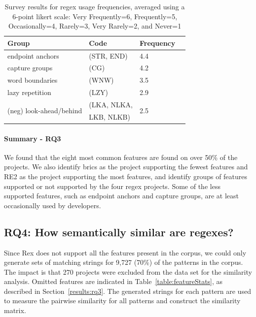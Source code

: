 \begin{table}
\caption{Survey results for regex usage frequencies, averaged using a 6-point likert scale: Very Frequently=6, Frequently=5, Occasionally=4, Rarely=3, Very Rarely=2, and Never=1 \label{tab:regexfeaturegroups}}
\begin{center}
\begin{small}
\begin{tabular}{lllc}
Group & Code &  Frequency \\ \hline
endpoint anchors & (STR, END) & 4.4\\
capture groups & (CG) & 4.2 \\
word boundaries & (WNW) & 3.5 \\
lazy repetition & (LZY) &  2.9\\ 
\multirow{2}{*}{(neg) look-ahead/behind} &  (LKA, NLKA,  & \multirow{2}{*}{2.5}\\
& LKB, NLKB) & \\
\end{tabular}
\end{small}
\end{center}
\end{table}




\paragraph{Summary - RQ3}
We found that the eight most common features are found on over 50\% of the projects.
We also identify brics as the project supporting the fewest features and RE2 as the project supporting the most features, and identify groups of features supported or not supported by the four regex projects. Some of the less supported features, such as endpoint anchors and capture groups, are at least occasionally used by developers. 


\subsection{RQ4: How semantically similar are regexes?}
\label{rq4:results}

 Since Rex does not support all the features present in the corpus, we could only generate sets of matching strings for 9,727 (70\%) of the  patterns in the corpus. The impact is that 270 projects were excluded from the data set for the similarity analysis. Omitted features are indicated in Table~\ref{table:featureStats}, as described in Section~\ref{results:rq3}.
The generated strings for each pattern are used to measure the pairwise similarity for all patterns and construct the similarity matrix.


